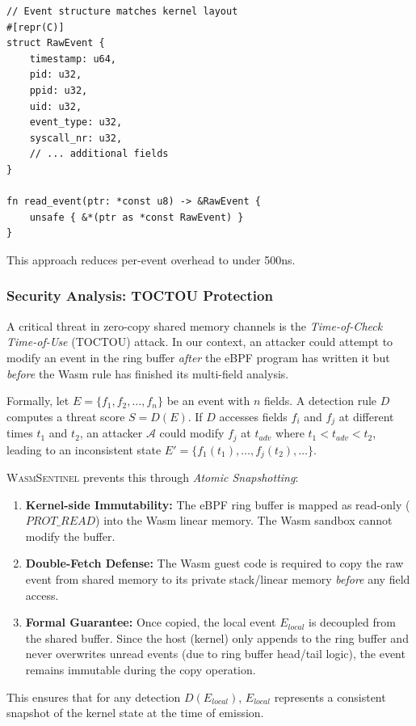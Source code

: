 \begin{lstlisting}[style=rust, caption={Zero-copy event access in Wasm.}]
// Event structure matches kernel layout
#[repr(C)]
struct RawEvent {
    timestamp: u64,
    pid: u32,
    ppid: u32,
    uid: u32,
    event_type: u32,
    syscall_nr: u32,
    // ... additional fields
}

fn read_event(ptr: *const u8) -> &RawEvent {
    unsafe { &*(ptr as *const RawEvent) }
}
\end{lstlisting}

This approach reduces per-event overhead to under 500ns.

\subsubsection{Security Analysis: TOCTOU Protection}
\label{sec:design-toctou}

A critical threat in zero-copy shared memory channels is the \textit{Time-of-Check Time-of-Use} (TOCTOU) attack.
In our context, an attacker could attempt to modify an event in the ring buffer \textit{after} the eBPF program has written it but \textit{before} the Wasm rule has finished its multi-field analysis.

Formally, let $E = \{f_1, f_2, \dots, f_n\}$ be an event with $n$ fields.
A detection rule $D$ computes a threat score $S = D(E)$.
If $D$ accesses fields $f_i$ and $f_j$ at different times $t_1$ and $t_2$, an attacker $\mathcal{A}$ could modify $f_j$ at $t_{adv}$ where $t_1 < t_{adv} < t_2$, leading to an inconsistent state $E' = \{f_1(t_1), \dots, f_j(t_2), \dots\}$.

\textsc{WasmSentinel} prevents this through \textit{Atomic Snapshotting}:

\begin{enumerate}
    \item \textbf{Kernel-side Immutability:} The eBPF ring buffer is mapped as read-only ($PROT\_READ$) into the Wasm linear memory. The Wasm sandbox cannot modify the buffer.
    \item \textbf{Double-Fetch Defense:} The Wasm guest code is required to copy the raw event from shared memory to its private stack/linear memory \textit{before} any field access.
    \item \textbf{Formal Guarantee:} Once copied, the local event $E_{local}$ is decoupled from the shared buffer. Since the host (kernel) only appends to the ring buffer and never overwrites unread events (due to ring buffer head/tail logic), the event remains immutable during the copy operation.
\end{enumerate}

This ensures that for any detection $D(E_{local})$, $E_{local}$ represents a consistent snapshot of the kernel state at the time of emission.

